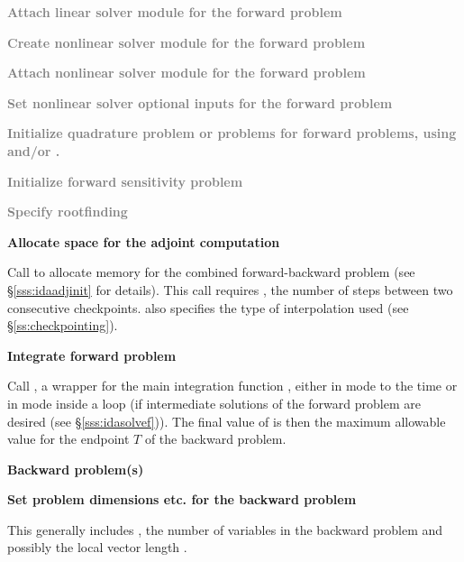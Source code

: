 \begin{Steps}
\item
  \textcolor{gray}{\bf Attach linear solver module for the forward problem}

\item
  \textcolor{gray}{\bf Create nonlinear solver module for the forward problem}

\item
  \textcolor{gray}{\bf Attach nonlinear solver module for the forward problem}

\item
  \textcolor{gray}{\bf Set nonlinear solver optional inputs for the forward problem}

\item
  \textcolor{gray}{\bf Initialize quadrature problem or problems for forward
   problems, using  and/or .}

\item
  \textcolor{gray}{\bf Initialize forward sensitivity problem}

\item
  \textcolor{gray}{\bf Specify rootfinding}

\item
  {\bf Allocate space for the adjoint computation}

  Call \id{()} to allocate memory for the
  combined forward-backward problem (see \S\ref{sss:idaadjinit} for details).
  This call requires , the number of steps between two consecutive checkpoints.
   also specifies the type of interpolation used
  (see \S\ref{ss:checkpointing}).

\item
  {\bf Integrate forward problem}

  Call , a wrapper for the {\idas} main integration
  function , either in  mode to the time
   or in  mode inside a loop (if intermediate
  solutions of the forward problem are desired (see \S\ref{sss:idasolvef})).
  The final value of  is then the maximum allowable value for
  the endpoint $T$ of the backward problem.

  \vspace{0.2in}\centerline{\bf Backward problem(s)}

 \item \label{i:back_start}
   {\bf Set problem dimensions etc. for the backward problem}

   This generally includes , the number of variables in the backward problem
   and possibly the local vector length .


\end{Steps}

